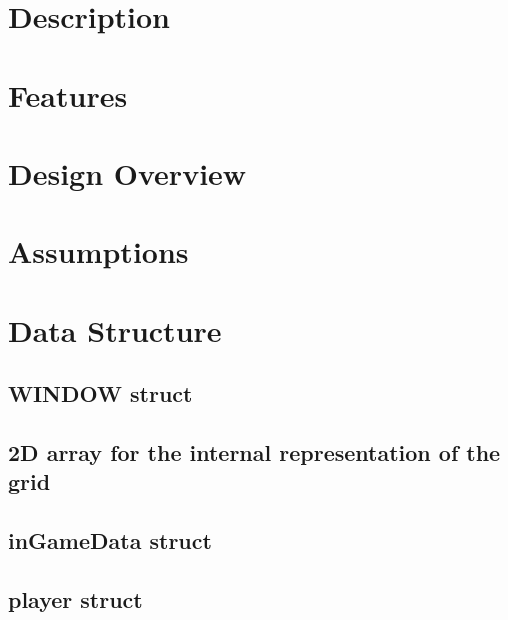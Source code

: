\documentclass{article}
\begin{document}
	\section{Description}
	
	
	\section{Features}
	
	
	\section{Design Overview}
	
	
	\section{Assumptions}
	
	
	\section{Data Structure}
		\subsection{WINDOW struct}
		
		\subsection{2D array for the internal representation of the grid}
		
		\subsection{inGameData struct}
		
		\subsection{player struct}
		
\end{document}
